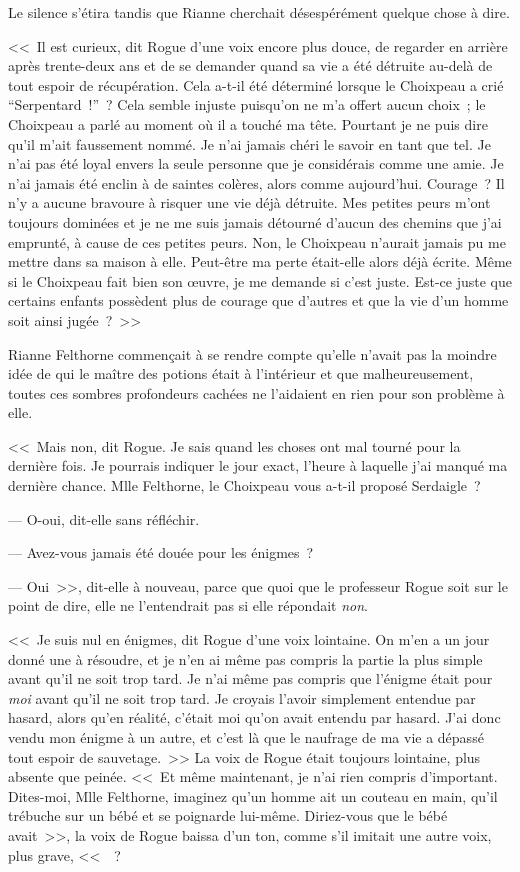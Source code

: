 Le silence s'étira tandis que Rianne cherchait désespérément quelque chose à dire.

<<~Il est curieux, dit Rogue d'une voix encore plus douce, de regarder en arrière après trente-deux ans et de se demander quand sa vie a été détruite au-delà de tout espoir de récupération. Cela a-t-il été déterminé lorsque le Choixpeau a crié “Serpentard~!”~? Cela semble injuste puisqu'on ne m'a offert aucun choix~; le Choixpeau a parlé au moment où il a touché ma tête. Pourtant je ne puis dire qu'il m'ait faussement nommé. Je n'ai jamais chéri le savoir en tant que tel. Je n'ai pas été loyal envers la seule personne que je considérais comme une amie. Je n'ai jamais été enclin à de saintes colères, alors comme aujourd'hui. Courage~? Il n'y a aucune bravoure à risquer une vie déjà détruite. Mes petites peurs m'ont toujours dominées et je ne me suis jamais détourné d'aucun des chemins que j'ai emprunté, à cause de ces petites peurs. Non, le Choixpeau n'aurait jamais pu me mettre dans sa maison à elle. Peut-être ma perte était-elle alors déjà écrite. Même si le Choixpeau fait bien son œuvre, je me demande si c'est juste. Est-ce juste que certains enfants possèdent plus de courage que d'autres et que la vie d'un homme soit ainsi jugée~?~>>

Rianne Felthorne commençait à se rendre compte qu'elle n'avait pas la moindre idée de qui le maître des potions était à l'intérieur et que malheureusement, toutes ces sombres profondeurs cachées ne l'aidaient en rien pour son problème à elle.

<<~Mais non, dit Rogue. Je sais quand les choses ont mal tourné pour la dernière fois. Je pourrais indiquer le jour exact, l'heure à laquelle j'ai manqué ma dernière chance. Mlle Felthorne, le Choixpeau vous a-t-il proposé Serdaigle~?

--- O-oui, dit-elle sans réfléchir.

--- Avez-vous jamais été douée pour les énigmes~?

--- Oui~>>, dit-elle à nouveau, parce que quoi que le professeur Rogue soit sur le point de dire, elle ne l'entendrait pas si elle répondait \emph{non}.

<<~Je suis nul en énigmes, dit Rogue d'une voix lointaine. On m'en a un jour donné une à résoudre, et je n'en ai même pas compris la partie la plus simple avant qu'il ne soit trop tard. Je n'ai même pas compris que l'énigme était pour \emph{moi} avant qu'il ne soit trop tard. Je croyais l'avoir simplement entendue par hasard, alors qu'en réalité, c'était moi qu'on avait entendu par hasard. J'ai donc vendu mon énigme à un autre, et c'est là que le naufrage de ma vie a dépassé tout espoir de sauvetage.~>> La voix de Rogue était toujours lointaine, plus absente que peinée. <<~Et même maintenant, je n'ai rien compris d'important. Dites-moi, Mlle Felthorne, imaginez qu'un homme ait un couteau en main, qu'il trébuche sur un bébé et se poignarde lui-même. Diriez-vous que le bébé avait~>>, la voix de Rogue baissa d'un ton, comme s'il imitait une autre voix, plus grave, <<~~?


